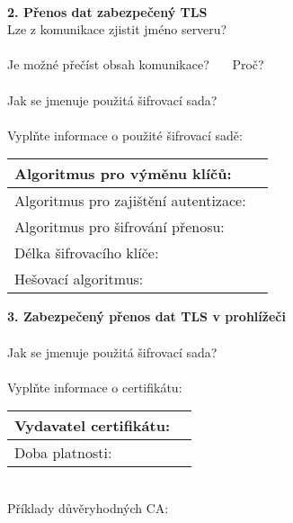 \documentclass[a4paper,11pt]{article}
\begin{document}
~\\
\textbf{2. Přenos dat zabezpečený TLS} \\
Lze z komunikace zjistit jméno serveru? \underline{\hspace{1cm}}\\
~\\
Je možné přečíst obsah komunikace? \underline{\hspace{1cm}}~~~Proč?~\underline{\hspace{8cm}}\\
~\\
Jak se jmenuje použitá šifrovací sada? \underline{\hspace{7cm}}\\
~\\
Vyplňte informace o použité šifrovací sadě:\\

\renewcommand\arraystretch{1.3}
\begin{tabular}{|l|r|}
\hline
Algoritmus pro výměnu klíčů: & \hspace{25.2em} \\ \hline
Algoritmus pro zajištění autentizace: & \\ \hline
Algoritmus pro šifrování přenosu: & \\ \hline
Délka šifrovacího klíče: & \\ \hline
Hešovací algoritmus: & \\ \hline
\end{tabular}
\renewcommand\arraystretch{1}
\vspace{0.5cm}

\textbf{3. Zabezpečený přenos dat TLS v prohlížeči} \\
~\\
Jak se jmenuje použitá šifrovací sada? \underline{\hspace{7cm}}\\
~\\
Vyplňte informace o certifikátu:\\

\renewcommand\arraystretch{1.3}
\begin{tabular}{|l|r|}
\hline
Vydavatel certifikátu: & \hspace{30em} \\ \hline
Doba platnosti: & \\ \hline
\end{tabular}
\renewcommand\arraystretch{1}
\vspace{0.5cm}
~\\
Příklady důvěryhodných CA: \underline{\hspace{11cm}}\\
\end{document}
